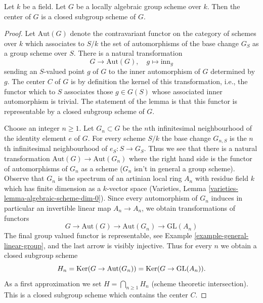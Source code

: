 \begin{lemma}
\label{lemma-algebraic-center}
Let $k$ be a field. Let $G$ be a locally algebraic group scheme over $k$.
Then the center of $G$ is a closed subgroup scheme of $G$.
\end{lemma}

\begin{proof}
Let $\text{Aut}(G)$ denote the contravariant functor on the category of
schemes over $k$ which associates to $S/k$ the set of automorphisms
of the base change $G_S$ as a group scheme over $S$. There is a natural
transformation
$$
G \longrightarrow \text{Aut}(G),\quad
g \longmapsto \text{inn}_g
$$
sending an $S$-valued point $g$ of $G$ to the inner automorphism of $G$
determined by $g$. The center $C$ of $G$ is by definition the kernel of
this transformation, i.e., the functor which to $S$ associates those
$g \in G(S)$ whose associated inner automorphism is trivial. The statement
of the lemma is that this functor is representable by a closed subgroup
scheme of $G$.

\medskip\noindent
Choose an integer $n \geq 1$. Let $G_n \subset G$ be the $n$th infinitesimal
neighbourhood of the identity element $e$ of $G$. For every scheme $S/k$
the base change $G_{n, S}$ is the $n$th infinitesimal neighbourhood of
$e_S : S \to G_S$. Thus we see that there is a natural transformation
$\text{Aut}(G) \to \text{Aut}(G_n)$ where the right hand side is the
functor of automorphisms of $G_n$ as a scheme ($G_n$ isn't in general
a group scheme). Observe that $G_n$ is the spectrum of an artinian
local ring $A_n$ with residue field $k$ which has finite dimension
as a $k$-vector space
(Varieties, Lemma \ref{varieties-lemma-algebraic-scheme-dim-0}).
Since every automorphism of $G_n$ induces in particular an invertible
linear map $A_n \to A_n$, we obtain transformations of functors
$$
G \to \text{Aut}(G) \to \text{Aut}(G_n) \to \text{GL}(A_n)
$$
The final group valued functor is representable, see
Example \ref{example-general-linear-group}, and the
last arrow is visibly injective.
Thus for every $n$ we obtain a closed subgroup scheme
$$
H_n = \mathop{\mathrm{Ker}}(G \to \text{Aut}(G_n)) = \mathop{\mathrm{Ker}}(G \to \text{GL}(A_n)).
$$
As a first approximation we set $H = \bigcap_{n \geq 1} H_n$
(scheme theoretic intersection). This is a closed subgroup scheme
which contains the center $C$.


\end{proof}
